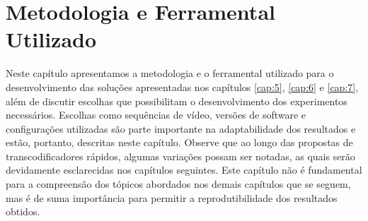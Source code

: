 \chapter{Metodologia e Ferramental Utilizado}
\label{cap:4}

Neste capítulo apresentamos a metodologia e o ferramental utilizado para o desenvolvimento das soluções apresentadas nos capítulos \ref{cap:5}, \ref{cap:6} e \ref{cap:7}, além de discutir escolhas que possibilitam o desenvolvimento dos experimentos necessários. Escolhas como sequências de vídeo, versões de software e configurações utilizadas são parte importante na adaptabilidade dos resultados e estão, portanto, descritas neste capítulo. Observe que ao longo das propostas de transcodificadores rápidos, algumas variações possam ser notadas, as quais serão devidamente esclarecidas nos capítulos seguintes. Este capítulo não é fundamental para a compreensão dos tópicos abordados nos demais capítulos que se seguem, mas é de suma importância para permitir a reprodutibilidade dos resultados obtidos.



